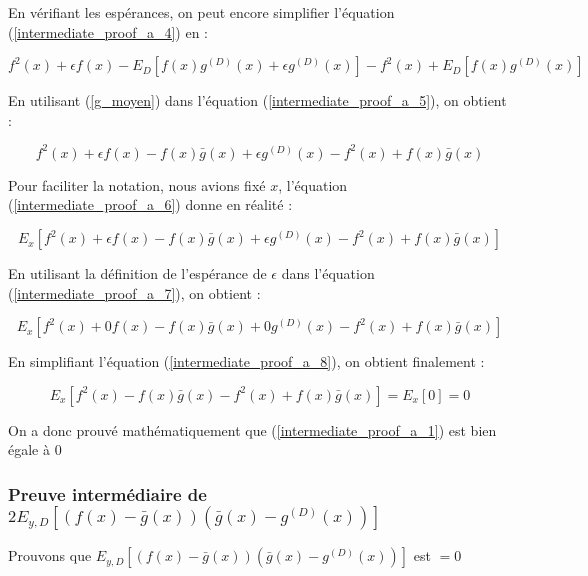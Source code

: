\documentclass[a4paper]{article}
\begin{document}
En vérifiant les espérances, on peut encore simplifier l'équation (\ref{intermediate_proof_a_4}) en :

\begin{equation}
\label{intermediate_proof_a_5}
f^2(x) + \epsilon f(x) - E_D[f(x)g^{(D)}(x) + \epsilon g^{(D)}(x)] - f^2(x) + E_D[ f(x)g^{(D)}(x)]
\end{equation}

En utilisant (\ref{g_moyen}) dans l'équation (\ref{intermediate_proof_a_5}), on obtient :

\begin{equation}
\label{intermediate_proof_a_6}
f^2(x) + \epsilon f(x) - f(x)\bar{g}(x) + \epsilon g^{(D)}(x) - f^2(x) + f(x)\bar{g}(x)
\end{equation}

Pour faciliter la notation, nous avions fixé $x$, l'équation (\ref{intermediate_proof_a_6})  donne en réalité :

\begin{equation}
\label{intermediate_proof_a_7}
E_x[f^2(x) + \epsilon f(x) - f(x)\bar{g}(x) + \epsilon g^{(D)}(x) - f^2(x) + f(x)\bar{g}(x)]
\end{equation}

En utilisant la définition de l'espérance de $\epsilon$ dans l'équation (\ref{intermediate_proof_a_7}), on obtient :

\begin{equation}
\label{intermediate_proof_a_8}
E_x[f^2(x) + 0 f(x) - f(x)\bar{g}(x) + 0 g^{(D)}(x) - f^2(x) + f(x)\bar{g}(x)]
\end{equation}

En simplifiant l'équation (\ref{intermediate_proof_a_8}), on obtient finalement :

\begin{equation}
\label{intermediate_proof_a_9}
E_x[f^2(x) - f(x)\bar{g}(x) - f^2(x) + f(x)\bar{g}(x)] = E_x[0] = 0
\end{equation}

On a donc prouvé mathématiquement que (\ref{intermediate_proof_a_1}) est bien égale à 0
\newpage

\subsubsection{Preuve intermédiaire de $2E_{y,D} [(f(x)-\bar{g}(x)) (\bar{g}(x) - g^{(D)}(x)) ]$}
\label{intermediate_proof_b_subsection}
Prouvons que $E_{y,D} [(f(x)-\bar{g}(x)) (\bar{g}(x) - g^{(D)}(x)) ]$ est $= 0$ 
\end{document}
